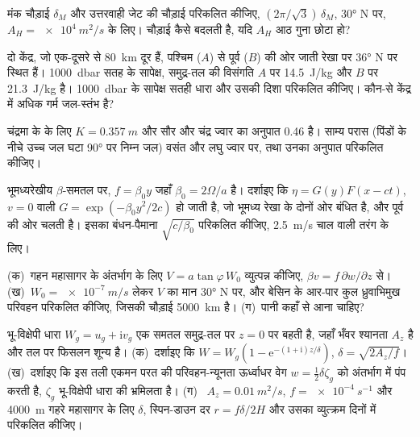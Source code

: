 \begin{exercise}[$\star\star$]\label{exo:b3:ocean-dynamics:7}
मंक चौड़ाई $\delta_M$ और उत्तरवाही जेट की चौड़ाई परिकलित कीजिए,
$(2\pi/\sqrt3)\,\delta_M$, \ang{30} N पर, $A_H = \qty{e4}{m^2/s}$ के लिए। चौड़ाई कैसे
बदलती है, यदि $A_H$ आठ गुना छोटा हो?
\end{exercise}

\begin{exercise}[$\star\star$]\label{exo:b3:ocean-dynamics:8}
दो केंद्र, जो एक-दूसरे से \qty{80}{km} दूर हैं, पश्चिम ($A$) से पूर्व
($B$) की ओर जाती रेखा पर \ang{36} N पर स्थित हैं। \qty{1000}{dbar} सतह के सापेक्ष, समुद्र-तल की
 विसंगति $A$ पर \qty{14.5}{J/kg} और
$B$ पर \qty{21.3}{J/kg} है। \qty{1000}{dbar} के सापेक्ष सतही धारा
और उसकी दिशा परिकलित कीजिए। कौन-से केंद्र में अधिक गर्म
जल-स्तंभ है?
\end{exercise}

\begin{exercise}[$\star\star$]\label{exo:b3:ocean-dynamics:9}
चंद्रमा के  के लिए $K = \qty{0.357}{m}$ और
सौर और चंद्र ज्वार का अनुपात \num{0.46} है। साम्य परास
(पिंडों के नीचे उच्च जल घटा \ang{90} पर निम्न जल) वसंत और
लघु ज्वार पर, तथा उनका अनुपात परिकलित कीजिए।
\end{exercise}

\begin{exercise}[$\star\star\star$]\label{exo:b3:ocean-dynamics:10}
भूमध्यरेखीय $\beta$-समतल पर, $f = \beta_0y$ जहाँ $\beta_0 =
2\Omega/a$ है। दर्शाइए कि $\eta = G(y)F(x - ct)$, $v = 0$ वाली 
$G = \exp(-\beta_0y^2/2c)$ हो जाती है, जो भूमध्य रेखा के दोनों ओर बंधित है,
और पूर्व की ओर चलती है। इसका बंधन-पैमाना $\sqrt{c/\beta_0}$ परिकलित कीजिए,
\qty{2.5}{m/s} चाल वाली तरंग के लिए।
\end{exercise}

\begin{exercise}[$\star\star\star$]\label{exo:b3:ocean-dynamics:11}
(क)~गहन महासागर के अंतर्भाग के लिए $V = a\tan\varphi\,W_0$ व्युत्पन्न कीजिए, $\beta v =
f\,\partial w/\partial z$ से। (ख)~$W_0 = \qty{e-7}{m/s}$ लेकर $V$ का मान
\ang{30} N पर, और बेसिन के आर-पार कुल ध्रुवाभिमुख परिवहन परिकलित कीजिए,
जिसकी चौड़ाई \qty{5000}{km} है। (ग)~पानी कहाँ से आना चाहिए?
\end{exercise}

\begin{exercise}[$\star\star\star$]\label{exo:b3:ocean-dynamics:12}
भू-विक्षेपी धारा $W_g = u_g + \mathrm iv_g$ एक समतल समुद्र-तल पर
$z = 0$ पर बहती है, जहाँ भँवर श्यानता $A_z$ है और तल पर फिसलन शून्य है।
(क)~दर्शाइए कि $W = W_g(1 - \mathrm e^{-(1+\mathrm i)z/\delta})$, $\delta =
\sqrt{2A_z/f}$। (ख)~दर्शाइए कि इस तली एकमन परत की परिवहन-न्यूनता
ऊर्ध्वाधर वेग $w = \tfrac12\delta\zeta_g$ को अंतर्भाग में पंप करती है,
$\zeta_g$ भू-विक्षेपी धारा की भ्रमिलता है। (ग)~
$A_z = \qty{0.01}{m^2/s}$, $f = \qty{e-4}{s^{-1}}$ और
\qty{4000}{m} गहरे महासागर के लिए $\delta$, स्पिन-डाउन दर $r =
f\delta/2H$ और उसका व्युत्क्रम दिनों में परिकलित कीजिए।
\end{exercise}

